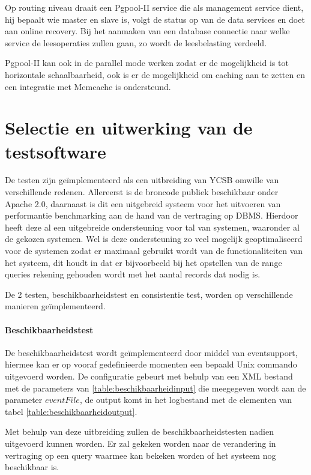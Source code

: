 Op routing niveau draait een Pgpool-II service die als management service dient, hij bepaalt wie master en slave is, volgt de status op van de data services en doet aan online recovery. Bij het aanmaken van een database connectie naar welke service de leesoperaties zullen gaan, zo wordt de leesbelasting verdeeld. 

Pgpool-II kan ook in de parallel mode werken zodat er de mogelijkheid is tot horizontale schaalbaarheid, ook is er de mogelijkheid om caching aan te zetten en een integratie met Memcache is ondersteund. 

\section{Selectie en uitwerking van de testsoftware}
De testen zijn geïmplementeerd als een uitbreiding van YCSB\cite{cooper2010benchmarking} omwille van verschillende redenen. Allereerst is de broncode publiek beschikbaar onder Apache 2.0, daarnaast is dit een uitgebreid systeem voor het uitvoeren van performantie benchmarking aan de hand van de vertraging op DBMS. Hierdoor heeft deze al een uitgebreide ondersteuning voor tal van systemen, waaronder al de gekozen systemen. Wel is deze ondersteuning zo veel mogelijk geoptimaliseerd voor de systemen zodat er maximaal gebruikt wordt van de functionaliteiten van het systeem, dit houdt in dat er bijvoorbeeld bij het opstellen van de range queries rekening gehouden wordt met het aantal records dat nodig is. 

De 2 testen, beschikbaarheidstest en consistentie test, worden op verschillende manieren geïmplementeerd. 

\paragraph{Beschikbaarheidstest} De beschikbaarheidstest wordt geïmplementeerd door middel van \gls{eventsupport}, hiermee kan er op vooraf gedefinieerde momenten een bepaald Unix commando uitgevoerd worden. De configuratie gebeurt met behulp van een XML bestand met de parameters van \ref{table:beschikbaarheidinput} die meegegeven wordt aan de parameter $eventFile$, de output komt in het logbestand met de elementen van tabel \ref{table:beschikbaarheidoutput}. 

Met behulp van deze uitbreiding zullen de beschikbaarheidstesten nadien uitgevoerd kunnen worden. Er zal gekeken worden naar de verandering in vertraging op een query waarmee kan bekeken worden of het systeem nog beschikbaar is. 

